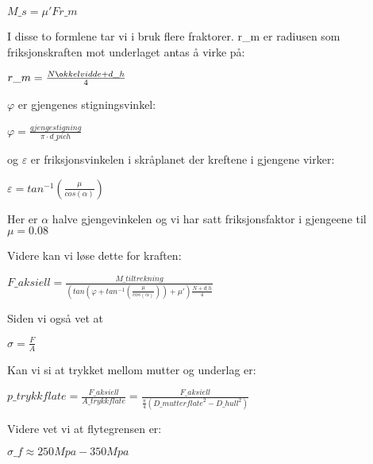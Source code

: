 $M\_{s}=\mu 'Fr\_{m}$

I disse to formlene tar vi i bruk flere fraktorer.  r\_{m} er radiusen som friksjonskraften mot underlaget antas å virke på:

$r\_{m}=\frac{N\o kkelvidde+d\_{h}}{4}$

$\varphi$ er gjengenes stigningsvinkel:

$\varphi =\frac{gjengestigning}{\pi \cdot d\_{pich}}$

og $\varepsilon$ er friksjonsvinkelen i skråplanet der kreftene i gjengene virker:

$\varepsilon =tan^{-1}(\frac{\mu}{cos(\alpha )})$

Her er $\alpha$ halve gjengevinkelen og vi har satt friksjonsfaktor i gjengeene til $\mu=0.08$ \cite{FriksjonsfaktorGjenger} %

Videre kan vi løse dette for kraften:

$F\_{aksiell}=\frac{M\_{tiltrekning}}{(tan(\varphi +tan^{-1}(\frac{\mu }{cos(\alpha )}))+\mu')\frac{N+d\_{h}}{4}}$

Siden vi også vet at

$\sigma=\frac{F}{A}$

Kan vi si at trykket mellom mutter og underlag er:

$p\_{trykkflate}=\frac{F\_{aksiell}}{A\_{trykkflate}}=\frac{F\_{aksiell}}{\frac{\pi }{4}(D\_{mutterflate}^{2}-D\_{hull}^{2})}$

Videre vet vi at flytegrensen er:


$\sigma \_{f}\approx 250 Mpa-350 Mpa$